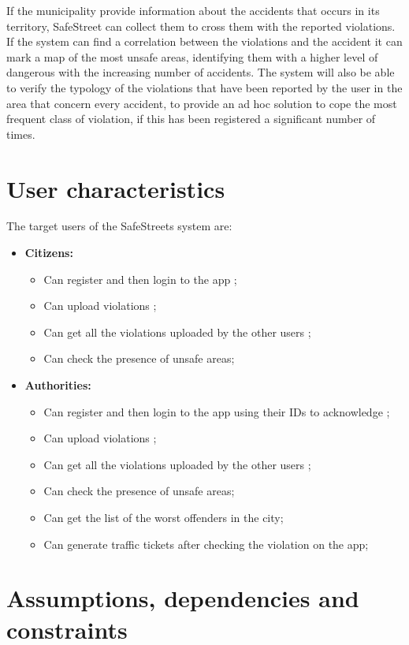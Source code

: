 \documentclass[../RASD.tex]{subfiles}
\begin{document}
    If the municipality provide information about the accidents that occurs in its territory, SafeStreet can collect them to cross them with the reported violations. If the system can find a correlation between the violations and the accident it can mark a map of the most unsafe areas, identifying them with a higher level of dangerous with the increasing number of accidents. The system will also be able to verify the typology of the violations that have been reported by the user in the area that concern every accident, to provide an ad hoc solution to cope the most frequent class of violation, if this has been registered a significant number of times.
    \section{User characteristics}\label{sec:user-characteristics}
    The target users of the SafeStreets system are:
    \begin{itemize}
        \item \textbf{Citizens:}
        \begin{itemize}
            \item Can register and then login to the app ;
            \item Can upload violations ;
            \item Can get all the violations uploaded by the other users ;
            \item Can check the presence of unsafe areas;
        \end{itemize}
        \item \textbf{Authorities:}
        \begin{itemize}
            \item Can register and then login to the app using their IDs to acknowledge ;
            \item Can upload violations ;
            \item Can get all the violations uploaded by the other users ;
            \item Can check the presence of unsafe areas;
            \item Can get the list of the worst offenders in the city;
            \item Can generate traffic tickets after checking the violation on the app;
        \end{itemize}
    \end{itemize}
    \section{Assumptions, dependencies and constraints}\label{sec:assumptions,-dependencies-and-constraints}
\end{document}

